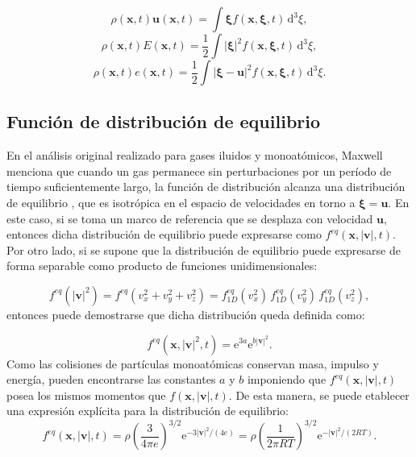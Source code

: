 \begin{equation}
	\rho(\bm{x},t) \bm{u}(\bm{x},t) = \int \bm{\xi} f(\bm{x},\bm{\xi},t) \, \mbox{d}^3 \xi,
\end{equation}
\begin{equation}
	\rho(\bm{x},t) E(\bm{x},t) = \dfrac{1}{2} \int |\bm{\xi}|^2 f(\bm{x},\bm{\xi},t) \, \mbox{d}^3 \xi,
\end{equation}
\begin{equation}
	\rho(\bm{x},t) e(\bm{x},t) = \dfrac{1}{2} \int |\bm{\xi}-\bm{u}|^2 f(\bm{x},\bm{\xi},t) \, \mbox{d}^3 \xi.
\end{equation}


\subsection{Funci\'on de distribuci\'on de equilibrio}
En el an\'alisis original realizado para gases iluidos y monoat\'omicos, Maxwell  menciona que cuando un gas permanece sin perturbaciones por un per\'iodo de tiempo suficientemente largo, la funci\'on de distribuci\'on \fvar{} alcanza una distribuci\'on de equilibrio \feqvar{}, que es isotr\'opica en el espacio de velocidades en torno a $\bm{\xi} = \bm{u}$. En este caso, si se toma un marco de referencia que se desplaza con velocidad $\bm{u}$, entonces dicha distribuci\'on de equilibrio puede expresarse como $f^{eq}(\bm{x},|\bm{v}|,t)$. Por otro lado, si se supone que la distribuci\'on de equilibrio puede expresarse de forma separable como producto de funciones unidimensionales:

\begin{equation}
	f^{eq}(|\bm{v}|^2) = f^{eq}(v_x^2 + v_y^2 + v_z^2)=f_{1D}^{eq}(v_x^2) \, f_{1D}^{eq}(v_y^2) \, f_{1D}^{eq}(v_z^2),
\end{equation}
entonces puede demostrarse que dicha distribuci\'on queda definida como:

\begin{equation}
	f^{eq}(\bm{x},|\bm{v}|^2,t) = \mbox{e}^{3a}\mbox{e}^{b|\bm{v}|^2}.
\end{equation}
Como las colisiones de part\'iculas monoat\'omicas conservan masa, impulso y energ\'ia, pueden encontrarse las constantes $a$ y $b$ imponiendo que $f^{eq}(\bm{x},|\bm{v}|,t)$ posea los mismos momentos que $f(\bm{x},|\bm{v}|,t)$. De esta manera, se puede etablecer una expresi\'on expl\'icita para la distribuci\'on de equilibrio:
\begin{equation}
	f^{eq}(\bm{x},|\bm{v}|,t) 
	= \rho \left( \dfrac{3}{4\pi e} \right)^{3/2} \mbox{e}^{-3|\bm{v}|^2/(4e)}
	= \rho \left( \dfrac{1}{2\pi RT} \right)^{3/2} \mbox{e}^{-|\bm{v}|^2/(2RT)}.
\end{equation}

